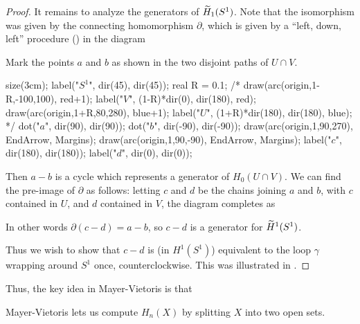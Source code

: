 \begin{proof}
	It remains to analyze the generators of $\widetilde H_1(S^1)$.
	Note that the isomorphism was given by the connecting homomorphism $\partial$,
	which is given by a ``left, down, left'' procedure ()
	in the diagram
	\begin{center}
	\end{center}
	Mark the points $a$ and $b$ as shown in the two disjoint paths of $U \cap V$.
	\begin{center}
		\begin{asy}
			size(3cm);
			label("$S^1$", dir(45), dir(45));
			real R = 0.1;
			/*
			draw(arc(origin,1-R,-100,100), red+1);
			label("$V$", (1-R)*dir(0), dir(180), red);
			draw(arc(origin,1+R,80,280), blue+1);
			label("$U$", (1+R)*dir(180), dir(180), blue);
			*/
			dot("$a$", dir(90), dir(90));
			dot("$b$", dir(-90), dir(-90));
			draw(arc(origin,1,90,270), EndArrow, Margins);
			draw(arc(origin,1,90,-90), EndArrow, Margins);
			label("$c$", dir(180), dir(180));
			label("$d$", dir(0), dir(0));
		\end{asy}
	\end{center}
	Then $a-b$ is a cycle which represents a generator of $H_0(U \cap V)$.
	We can find the pre-image of $\partial$ as follows:
	letting $c$ and $d$ be the chains joining $a$ and $b$, with $c$ contained
	in $U$, and $d$ contained in $V$, the diagram completes as
	\begin{center}
	\end{center}
	In other words $\partial(c-d) = a-b$, so $c-d$ is a generator for $\widetilde H^1(S^1)$.
	
	Thus we wish to show that $c-d$ is (in $H^1(S^1)$) equivalent to the loop $\gamma$
	wrapping around $S^1$ once, counterclockwise.
	This was illustrated in .
\end{proof}

Thus, the key idea in Mayer-Vietoris is that
\begin{moral}
	Mayer-Vietoris lets us compute $H_n(X)$
	by splitting $X$ into two open sets.
\end{moral}

